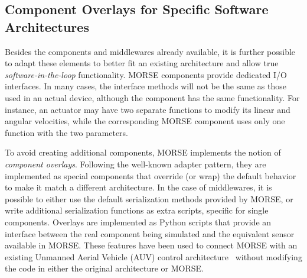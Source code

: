 \documentclass{llncs}
\newcommand{\serge}[1]{\nb{Serge}{blue}{#1}}
\begin{document}
\subsection{Component Overlays for Specific Software Architectures}
\label{section:overlays}


Besides the components and middlewares already available, it is
further possible to adapt these elements to better fit an existing
architecture and allow true \emph{software-in-the-loop} functionality.
MORSE components provide dedicated I/O interfaces. In
many cases, the interface methods will not be the same as those used in an
actual device, although the component has the same functionality.
For instance, an actuator may have two separate functions to modify its linear
and angular velocities, while the corresponding MORSE component uses only one
function with the two parameters.

To avoid creating additional components,
MORSE implements the notion of \emph{component overlays}. Following
the well-known adapter pattern, they are implemented as
special components that override (or wrap) the default
behavior to make it match a different architecture.
In the case of middlewares, it is possible to either use the default
serialization methods provided by MORSE, or write additional serialization
functions as extra scripts, specific for single components.
Overlays are implemented as Python scripts that provide an interface between
the real component being simulated and the equivalent sensor available in
MORSE.
These features have been used to connect MORSE with an existing
Unmanned Aerial Vehicle (AUV) control architecture~\cite{barbier2011}
without modifying the code in either the original architecture or MORSE.
\end{document}
